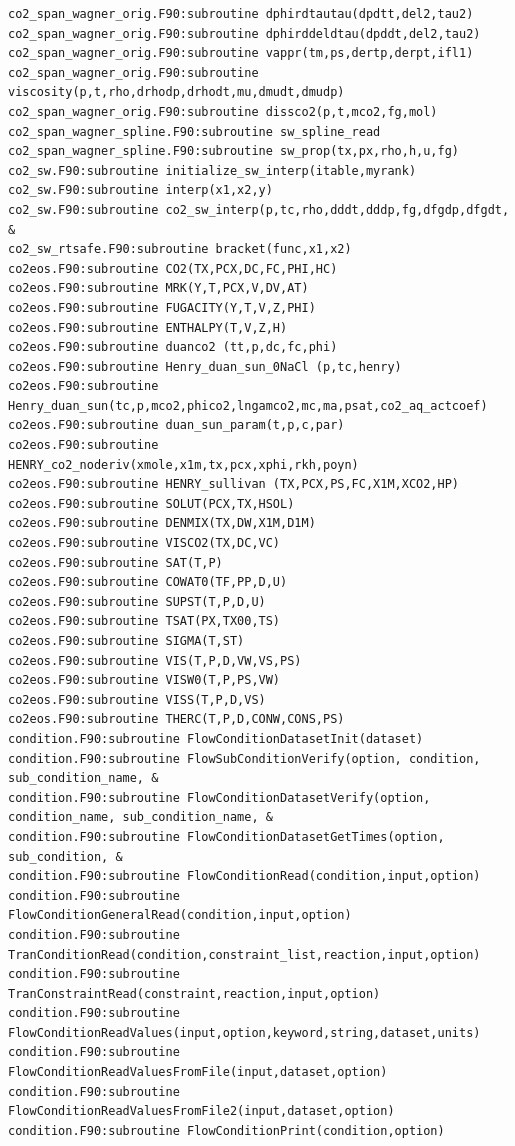 \documentclass[12pt]{article}
\begin{document}
\begin{verbatim}
co2_span_wagner_orig.F90:subroutine dphirdtautau(dpdtt,del2,tau2)
co2_span_wagner_orig.F90:subroutine dphirddeldtau(dpddt,del2,tau2)
co2_span_wagner_orig.F90:subroutine vappr(tm,ps,dertp,derpt,ifl1)
co2_span_wagner_orig.F90:subroutine viscosity(p,t,rho,drhodp,drhodt,mu,dmudt,dmudp)
co2_span_wagner_orig.F90:subroutine dissco2(p,t,mco2,fg,mol)
co2_span_wagner_spline.F90:subroutine sw_spline_read
co2_span_wagner_spline.F90:subroutine sw_prop(tx,px,rho,h,u,fg)
co2_sw.F90:subroutine initialize_sw_interp(itable,myrank)
co2_sw.F90:subroutine interp(x1,x2,y)
co2_sw.F90:subroutine co2_sw_interp(p,tc,rho,dddt,dddp,fg,dfgdp,dfgdt, &
co2_sw_rtsafe.F90:subroutine bracket(func,x1,x2)
co2eos.F90:subroutine CO2(TX,PCX,DC,FC,PHI,HC)
co2eos.F90:subroutine MRK(Y,T,PCX,V,DV,AT)
co2eos.F90:subroutine FUGACITY(Y,T,V,Z,PHI)
co2eos.F90:subroutine ENTHALPY(T,V,Z,H)
co2eos.F90:subroutine duanco2 (tt,p,dc,fc,phi)
co2eos.F90:subroutine Henry_duan_sun_0NaCl (p,tc,henry)
co2eos.F90:subroutine Henry_duan_sun(tc,p,mco2,phico2,lngamco2,mc,ma,psat,co2_aq_actcoef)
co2eos.F90:subroutine duan_sun_param(t,p,c,par)
co2eos.F90:subroutine HENRY_co2_noderiv(xmole,x1m,tx,pcx,xphi,rkh,poyn)
co2eos.F90:subroutine HENRY_sullivan (TX,PCX,PS,FC,X1M,XCO2,HP)
co2eos.F90:subroutine SOLUT(PCX,TX,HSOL)
co2eos.F90:subroutine DENMIX(TX,DW,X1M,D1M)
co2eos.F90:subroutine VISCO2(TX,DC,VC)
co2eos.F90:subroutine SAT(T,P)
co2eos.F90:subroutine COWAT0(TF,PP,D,U)
co2eos.F90:subroutine SUPST(T,P,D,U)
co2eos.F90:subroutine TSAT(PX,TX00,TS)
co2eos.F90:subroutine SIGMA(T,ST)
co2eos.F90:subroutine VIS(T,P,D,VW,VS,PS)
co2eos.F90:subroutine VISW0(T,P,PS,VW)
co2eos.F90:subroutine VISS(T,P,D,VS)
co2eos.F90:subroutine THERC(T,P,D,CONW,CONS,PS)
condition.F90:subroutine FlowConditionDatasetInit(dataset)
condition.F90:subroutine FlowSubConditionVerify(option, condition, sub_condition_name, &
condition.F90:subroutine FlowConditionDatasetVerify(option, condition_name, sub_condition_name, &
condition.F90:subroutine FlowConditionDatasetGetTimes(option, sub_condition, &
condition.F90:subroutine FlowConditionRead(condition,input,option)
condition.F90:subroutine FlowConditionGeneralRead(condition,input,option)
condition.F90:subroutine TranConditionRead(condition,constraint_list,reaction,input,option)
condition.F90:subroutine TranConstraintRead(constraint,reaction,input,option)
condition.F90:subroutine FlowConditionReadValues(input,option,keyword,string,dataset,units)
condition.F90:subroutine FlowConditionReadValuesFromFile(input,dataset,option)
condition.F90:subroutine FlowConditionReadValuesFromFile2(input,dataset,option)
condition.F90:subroutine FlowConditionPrint(condition,option)

\end{verbatim}
\end{document}
